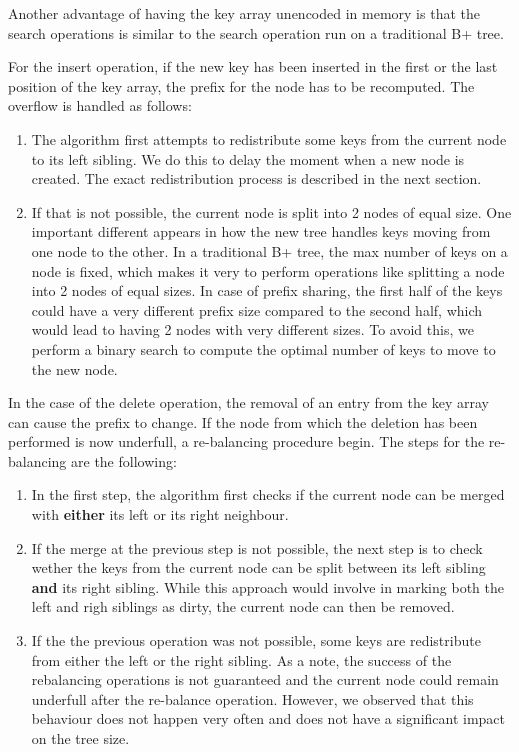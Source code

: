 \documentclass[11pt,a4paper,oneside]{article}
\begin{document}
Another advantage of having the key array unencoded in memory is that the search operations is similar to the search operation run on a traditional B+ tree. 

For the insert operation, if the new key has been inserted in the first or the last position of the key array, the prefix for the node has to be recomputed. The overflow is handled as follows:
\begin{enumerate}
	\item The algorithm first attempts to redistribute some keys from the current node to its left sibling. We do this to delay the moment when a new node is created. The exact redistribution process is described in the next section.
	\item If that is not possible, the current node is split into 2 nodes of equal size. One important different appears in how the new tree handles keys moving from one node to the other. In a traditional B+ tree, the max number of keys on a node is fixed, which makes it very to perform operations like splitting a node into 2 nodes of equal sizes. In case of prefix sharing, the first half of the keys could have a very different prefix size compared to the second half, which would lead to having 2 nodes with very different sizes. To avoid this, we perform a binary search to compute the optimal number of keys to move to the new node.
\end{enumerate}
	
In the case of the delete operation, the removal of an entry from the key array can cause the prefix to change. If the node from which the deletion has been performed is now underfull, a re-balancing procedure begin. The steps for the re-balancing are the following:
\begin{enumerate}
	\item In the first step, the algorithm first checks if the current node can be merged with \textbf{either} its left or its right neighbour. 
	\item If the merge at the previous step is not possible, the next step is to check wether the keys from the current node can be split between its left sibling \textbf{and} its right sibling. While this approach would involve in marking both the left and righ siblings as dirty, the current node can then be removed.
	\item If the the previous operation was not possible, some keys are redistribute from either the left or the right sibling. As a note, the success of the rebalancing operations is not guaranteed and the current node could remain underfull after the re-balance operation. However, we observed that this behaviour does not happen very often and does not have a significant impact on the tree size.
\end{enumerate}
\end{document}
